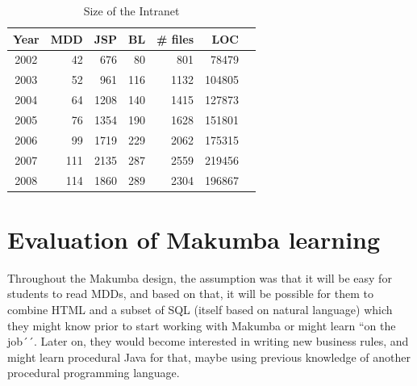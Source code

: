 \documentclass{chi2009}
\begin{document}
\begin{table}[t]
	\centering
	\begin{tabular}{c|r|r|r|r|r|r}
		\hline
		\hline
		Year	& MDD	& JSP	& BL	& \# files	& LOC		\\
		\hline
		\hline
		2002 	& 42	& 676	& 80	& 801		& 78479 	\\ 
		\hline
		2003 	& 52	& 961	& 116	& 1132		& 104805 	\\ 
		\hline
		2004 	& 64	& 1208	& 140	& 1415		& 127873 	\\ 
		\hline
		2005 	& 76	& 1354	& 190	& 1628		& 151801 	\\ 
		\hline
		2006 	& 99	& 1719	& 229	& 2062		& 175315 	\\ 
		\hline
		2007 	& 111	& 2135	& 287	& 2559		& 219456 	\\ 
		\hline
		2008 	& 114	& 1860	& 289	& 2304		& 196867 	\\ 
		\hline		
		\hline
		\hline
	\end{tabular}
	\caption{Size of the Intranet}
	\label{tab:intranet-size}
\end{table} 

\section{Evaluation of Makumba learning}\label{sec:techCommittee}
Throughout the Makumba design, the assumption was that it will be easy for students to read MDDs, and based on that, it will be possible for them to combine HTML and a subset of SQL (itself based on natural language) which they might know prior to start working with Makumba or might learn ``on the job´´. Later on, they would become interested in writing new business rules, and might learn procedural Java for that, maybe using previous knowledge of another procedural programming language. %
\end{document}
